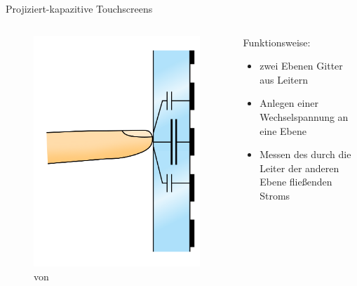 \documentclass[12pt, aspectratio=169]{beamer}
\begin{document}
	\begin{frame}{Projiziert-kapazitive Touchscreens}
		\begin{columns}
			\begin{column}{0.4\textwidth}
				\begin{figure}
					\includegraphics[max width=.9\textwidth,max height=.7\textheight]{../Images/ProjectedCapacitiveTouchScreen.png}
					\caption*{\tiny von }
				\end{figure}
			\end{column}
			\begin{column}{0.6\textwidth}
				Funktionsweise:
				\begin{itemize}
					\item<+-> zwei Ebenen Gitter aus Leitern
					\item<+-> Anlegen einer Wechselspannung an eine Ebene
					\item<+-> Messen des durch die Leiter der anderen Ebene fließenden Stroms
				\end{itemize}
			\end{column}
		\end{columns}
	\end{frame}
	
\end{document}
